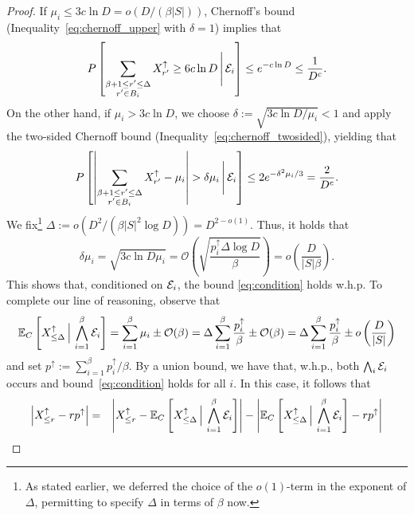 \documentclass[11pt]{article}
\newcommand{\E}{\mathbb{E}}
\newcommand{\BO}{\mathcal{O}}
\begin{document}
\begin{proof}
	
	If $\mu_i\leq 3c\ln D=o(D/(\beta|S|))$, Chernoff's bound (Inequality~\eqref{eq:chernoff_upper} with $\delta=1$) implies that
	\begin{equation*}
	P\left[\sum_{\substack{\beta+1\leq r'\leq \Delta\\ r'\in B_i}}X_{r'}^{\uparrow}\geq 6c\ln D\,\Bigg|\,{\cal E}_i\right]
	\leq e^{-c\ln D}\leq \frac{1}{D^c}.
	\end{equation*}
	On the other hand, if $\mu_i> 3c\ln D$, we choose $\delta:=\sqrt{3c\ln D/\mu_i}<1$ and apply the two-sided Chernoff bound (Inequality~\eqref{eq:chernoff_twosided}), yielding that
	\begin{equation*}
	P\left[\left|\sum_{\substack{\beta+1\leq r'\leq \Delta\\ r'\in B_i}}X_{r'}^{\uparrow}
	-\mu_i\right|>\delta \mu_i\,\Bigg|\,{\cal E}_i\right]
	\leq 2e^{-\delta^2\mu_i/3}= \frac{2}{D^c}.
	\end{equation*}
	We fix\footnote{As stated earlier, we deferred the choice of the $o(1)$-term in the exponent of $\Delta$, permitting to specify $\Delta$ in terms of $\beta$ now.} $\Delta:=o(D^2/(\beta |S|^2 \log D))=D^{2-o(1)}$. Thus, it holds that
	\begin{equation*}
	\delta \mu_i = \sqrt{3c\ln D\mu_i} = \BO\left(\sqrt{\frac{p_i^{\uparrow} \Delta \log D}{\beta}}\right)
	= o\left(\frac{D}{|S|\beta}\right).
	\end{equation*}
	This shows that, conditioned on ${\cal E}_i$, the bound \eqref{eq:condition} holds w.h.p. To complete our line of reasoning, observe that
	\begin{equation*}
	\E_C\left[X_{\leq \Delta}^{\uparrow}\,\Big |\,\bigwedge_{i=1}^{\beta} {\cal E}_i\right]=\sum_{i=1}^{\beta}\mu_i \pm \BO(\beta)= \Delta\sum_{i=1}^{\beta}\frac{p_i^{\uparrow}}{\beta}\pm \BO(\beta)=\Delta\sum_{i=1}^{\beta}\frac{p_i^{\uparrow}}{\beta}\pm o\left(\frac{D}{|S|}\right)
	\end{equation*}
	and set $p^{\uparrow}:=\sum_{i=1}^{\beta}p_i^{\uparrow}/\beta$.	By a union bound, we have that, w.h.p., both $\bigwedge_i {\cal E}_i$ occurs and bound~\eqref{eq:condition} holds for all $i$. In this case, it follows that
	\begin{eqnarray*}
	\left|X_{\leq r}^{\uparrow}-rp^{\uparrow}\right|&=&\left|X_{\leq r}^{\uparrow}-\E_C\left[X_{\leq \Delta}^{\uparrow}\,\Big |\,\bigwedge_{i=1}^{\beta} {\cal E}_i\right]\right|- \left|\E_C\left[X_{\leq \Delta}^{\uparrow}\,\Big |\,\bigwedge_{i=1}^{\beta} {\cal E}_i\right]-rp^{\uparrow}\right|\\

\end{eqnarray*}
\end{proof}
\end{document}
